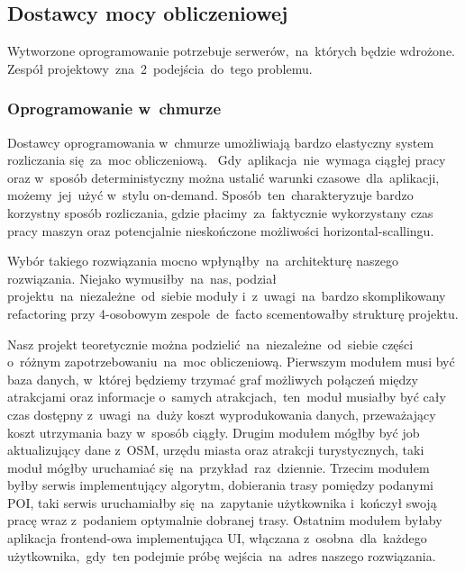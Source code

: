 \subsection{Dostawcy mocy obliczeniowej}
\label{subsec:dostawcy-mocy-obliczeniowej}
Wytworzone oprogramowanie potrzebuje serwerów,~na~których będzie wdrożone.
Zespół projektowy~zna~2~podejścia~do~tego problemu.
\subsubsection{\textnormal{Oprogramowanie w~chmurze}}
\indent Dostawcy oprogramowania w~chmurze umożliwiają bardzo elastyczny system rozliczania się~za~moc obliczeniową.
~Gdy~aplikacja~nie~wymaga ciągłej pracy oraz w~sposób deterministyczny można ustalić warunki czasowe~dla~aplikacji, możemy~jej~użyć w~stylu \gls{on-demand}.
Sposób~ten~charakteryzuje bardzo korzystny sposób rozliczania, gdzie płacimy~za~faktycznie wykorzystany czas pracy maszyn oraz potencjalnie nieskończone możliwości horizontal-scallingu.

\indent Wybór takiego rozwiązania mocno wpłynąłby~na~architekturę naszego rozwiązania.
Niejako wymusiłby~na~nas, podział projektu~na~niezależne~od~siebie moduły i~z~uwagi~na~bardzo skomplikowany \gls{refactoring} przy 4-osobowym zespole~de~facto scementowałby strukturę projektu.

\indent Nasz projekt teoretycznie można podzielić~na~niezależne~od~siebie części o~różnym zapotrzebowaniu~na~moc obliczeniową.
Pierwszym modułem musi być baza danych, w~której będziemy trzymać graf możliwych połączeń między atrakcjami oraz informacje o~samych atrakcjach,~ten~moduł musiałby być cały czas dostępny z~uwagi~na~duży koszt wyprodukowania danych, przeważający koszt utrzymania bazy w~sposób ciągły.
Drugim modułem mógłby być \gls{job} aktualizujący dane z~OSM, urzędu miasta oraz atrakcji turystycznych, taki moduł mógłby uruchamiać się~na~przykład~raz~dziennie.
Trzecim modułem byłby serwis implementujący algorytm, dobierania trasy pomiędzy podanymi POI, taki serwis uruchamiałby się~na~zapytanie użytkownika i~kończył swoją pracę wraz z~podaniem optymalnie dobranej trasy.
Ostatnim modułem byłaby aplikacja \gls{frontend}-owa implementująca UI, włączana z~osobna~dla~każdego użytkownika,~gdy~ten podejmie próbę wejścia~na~adres naszego rozwiązania.

